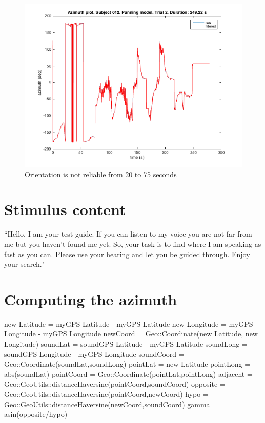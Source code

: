 \documentclass[journal]{IEEEtran}
\begin{document}
\begin{appendices}
\begin{figure}[h!]
  \centering
    \includegraphics[scale=0.5]{graphics/subject012panningtrial2.png}
  \caption{Orientation is not reliable from 20 to 75 seconds}
  \label{fig:plt6}
\end{figure}

\section{Stimulus content}
``Hello, I am your test guide. If you can listen to my voice you are not far from me but you haven't found me yet. So, your task is to find where I am speaking as fast as you can. Please use your hearing and let you be guided through. Enjoy your search."

\section{Computing the azimuth}
\begin{algorithm}
  new Latitude = myGPS Latitude - myGPS Latitude\;
  new Longitude = myGPS Longitude - myGPS Longitude\;
  newCoord = Geo::Coordinate(new Latitude, new Longitude)\;
  soundLat = soundGPS Latitude - myGPS Latitude\;
  soundLong = soundGPS Longitude - myGPS Longitude\;
  soundCoord = Geo::Coordinate(soundLat,soundLong)\;
  pointLat = new Latitude\;
  pointLong = abs(soundLat)\;
  pointCoord = Geo::Coordinate(pointLat,pointLong)\;
  adjacent = Geo::GeoUtils::distanceHaversine(pointCoord,soundCoord)\;
  opposite = Geo::GeoUtils::distanceHaversine(pointCoord,newCoord)\;
  hypo = Geo::GeoUtils::distanceHaversine(newCoord,soundCoord)\;
  gamma = asin(opposite/hypo)\;


\end{algorithm}
\end{appendices}
\end{document}
